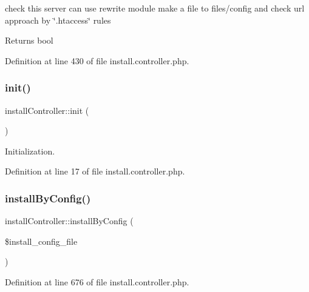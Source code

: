 check this server can use rewrite module make a file to files/config and check url approach by \char`\"{}.\+htaccess\char`\"{} rules

\begin{DoxyReturn}{Returns}
bool 
\end{DoxyReturn}


Definition at line 430 of file install.\+controller.\+php.

\mbox{\label{classinstallController_a99641d12063ae41f5a787ac159853c83}} 
\subsubsection{\texorpdfstring{init()}{init()}}
{\footnotesize\ttfamily install\+Controller\+::init (\begin{DoxyParamCaption}{ }\end{DoxyParamCaption})}



Initialization. 



Definition at line 17 of file install.\+controller.\+php.

\mbox{\label{classinstallController_a4ec44b3090b73660ba018945c2ffa239}} 
\subsubsection{\texorpdfstring{install\+By\+Config()}{installByConfig()}}
{\footnotesize\ttfamily install\+Controller\+::install\+By\+Config (\begin{DoxyParamCaption}\item[{}]{\$install\+\_\+config\+\_\+file }\end{DoxyParamCaption})}



Definition at line 676 of file install.\+controller.\+php.

\mbox{\label{classinstallController_ad7919cd4745794ee4f57db53e8105190}} 
